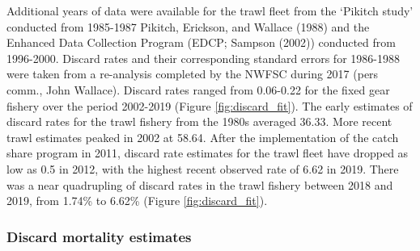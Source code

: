 \documentclass[11pt,
  english,
  a4paper,
]{article}
\begin{document}
\leavevmode\tagmcend\tagstructend\par


Additional years of data were available for the trawl fleet from the `Pikitch study' conducted from 1985-1987 {Pikitch, Erickson, and Wallace (1988)\leavevmode\tagmcend\tagstructend} and the Enhanced Data Collection Program (EDCP; {Sampson (2002)\leavevmode\tagmcend\tagstructend}) conducted from 1996-2000. Discard rates and their corresponding standard errors for 1986-1988 were taken from a re-analysis completed by the NWFSC during 2017 (pers comm., John Wallace). Discard rates ranged from 0.06-0.22 for the fixed gear fishery over the period 2002-2019 (Figure \ref{fig:discard_fit}). The early estimates of discard rates for the trawl fishery from the 1980s averaged 36.33. More recent trawl estimates peaked in 2002 at 58.64. After the implementation of the catch share program in 2011, discard rate estimates for the trawl fleet have dropped as low as 0.5 in 2012, with the highest recent observed rate of 6.62 in 2019. There was a near quadrupling of discard rates in the trawl fishery between 2018 and 2019, from 1.74\% to 6.62\% (Figure \ref{fig:discard_fit}).

\leavevmode\tagmcend\tagstructend\par


\hypertarget{discard-mortality-estimates}{%
\subsubsection{Discard mortality estimates}\label{discard-mortality-estimates}}

\leavevmode\tagmcend\tagstructend

\end{document}
